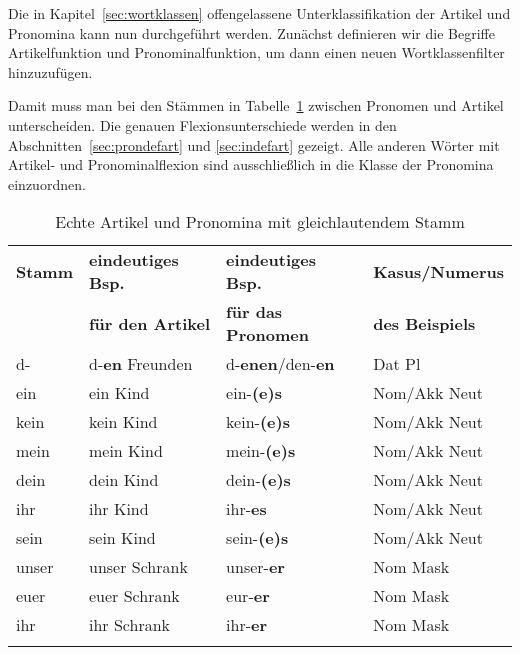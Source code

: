 Die in Kapitel~\ref{sec:wortklassen} offengelassene Unterklassifikation der Artikel und Pronomina kann nun durchgeführt werden.
Zunächst definieren wir die Begriffe Artikelfunktion und Pronominalfunktion, um dann einen neuen Wortklassenfilter hinzuzufügen.




Damit muss man bei den Stämmen in Tabelle~\ref{tab:art} zwischen Pronomen und Artikel unterscheiden.
Die genauen Flexionsunterschiede werden in den Abschnitten~\ref{sec:prondefart} und \ref{sec:indefart} gezeigt.
Alle anderen Wörter mit Artikel- und Pronominalflexion sind ausschließlich in die Klasse der Pronomina einzuordnen.

\begin{table}[!h]
  \centering
  \begin{tabular}{llll}
    \lsptoprule
    \textbf{Stamm} & \textbf{eindeutiges Bsp.} & \textbf{eindeutiges Bsp.} & \textbf{Kasus\slash Numerus} \\
    & \textbf{für den Artikel} & \textbf{für das Pronomen} & \textbf{des Beispiels} \\
    \midrule
    d- & d-\textbf{en} Freunden & d-\textbf{enen}/den-\textbf{en} & Dat Pl \\
    ein & ein Kind & ein-\textbf{(e)s} & Nom/Akk Neut \\
    kein & kein Kind & kein-\textbf{(e)s} & Nom/Akk Neut \\
    mein & mein Kind & mein-\textbf{(e)s} & Nom/Akk Neut \\
    dein & dein Kind & dein-\textbf{(e)s} & Nom/Akk Neut \\
    ihr & ihr Kind & ihr-\textbf{es} & Nom/Akk Neut \\
    sein & sein Kind & sein-\textbf{(e)s} & Nom/Akk Neut \\
    unser & unser Schrank & unser-\textbf{er} & Nom Mask \\
    euer & euer Schrank & eur-\textbf{er} & Nom Mask \\
    ihr & ihr Schrank & ihr-\textbf{er} & Nom Mask \\
    \lspbottomrule
  \end{tabular}
  \caption{Echte Artikel und Pronomina mit gleichlautendem Stamm}
  \label{tab:art}
\end{table}

